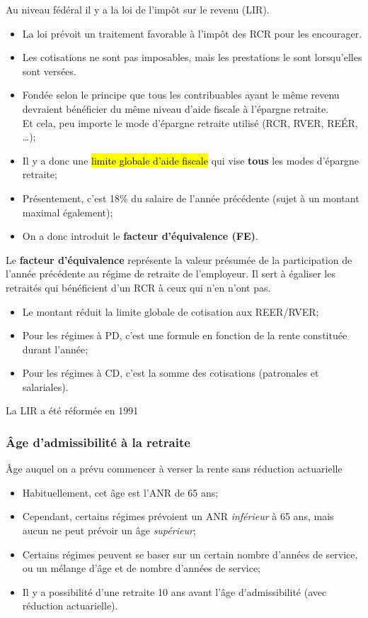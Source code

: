 \documentclass[10pt, french]{article}
\begin{document}
\begin{multicols*}{3}
Au niveau fédéral il y a la loi de l'impôt sur le revenu (LIR).
\begin{itemize}[leftmargin = *]
	\item	La loi prévoit un traitement favorable à l'impôt des RCR pour les encourager.
	\item	Les cotisations ne sont pas imposables, mais les prestations le sont lorsqu'elles sont versées.
	\item	Fondée selon le principe que tous les contribuables ayant le même revenu devraient bénéficier du même niveau d’aide fiscale à l’épargne retraite.\\
			Et cela, peu importe le mode d’épargne retraite utilisé (RCR, RVER, REÉR, \dots);
	\item	Il y a donc une \hl{limite globale d'aide fiscale} qui vise \textbf{tous} les modes d'épargne retraite;
	\item	Présentement, c'est 18\% du salaire de l'année précédente (sujet à un montant maximal également);
	\item	On a donc introduit le \textbf{facteur d'équivalence (FE)}.
\end{itemize}

\begin{definitionNOHFILL}
Le \textbf{facteur d'équivalence} représente la valeur présumée de la participation de l'année précédente au régime de retraite de l'employeur. Il sert à égaliser les retraités qui bénéficient d'un RCR à ceux qui n'en n'ont pas.

\begin{itemize}[leftmargin = *]
	\item	Le montant réduit la limite globale de cotisation aux REER/RVER;
	\item	Pour les régimes à PD, c'est une formule en fonction de la rente constituée durant l'année;
	\item	Pour les régimes à CD, c'est la somme des cotisations (patronales et salariales).
\end{itemize}
\end{definitionNOHFILL}

La LIR a été réformée en 1991


\subsubsection*{Âge d'admissibilité à la retraite}
Âge auquel on a prévu commencer à verser la rente sans réduction actuarielle

\begin{itemize}[leftmargin = *]
	\item	Habituellement, cet âge est l'ANR de 65 ans;
	\item	Cependant, certains régimes prévoient un ANR \textit{inférieur} à 65 ans, mais aucun ne peut prévoir un âge \textit{supérieur};
	\item	Certains régimes peuvent se baser sur un certain nombre d'années de service, ou un mélange d'âge et de nombre d'années de service;
	\item	Il y a possibilité d'une retraite 10 ans avant l'âge d'admissibilité (avec réduction actuarielle).
\end{itemize}



\end{multicols*}
\end{document}
